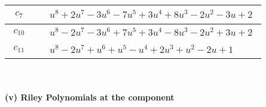 \documentclass[1p]{elsarticle_modified}
\theoremstyle{definition}
\begin{document}
\begin{tabular}{m{50pt}|m{274pt}}
\hline $$\begin{aligned}c_{7}\end{aligned}$$&$\begin{aligned}
&u^8+2 u^7-3 u^6-7 u^5+3 u^4+8 u^3-2 u^2-3 u+2
\end{aligned}$\\
\hline $$\begin{aligned}c_{10}\end{aligned}$$&$\begin{aligned}
&u^8-2 u^7-3 u^6+7 u^5+3 u^4-8 u^3-2 u^2+3 u+2
\end{aligned}$\\
\hline $$\begin{aligned}c_{11}\end{aligned}$$&$\begin{aligned}
&u^8-2 u^7+u^6+u^5- u^4+2 u^3+u^2-2 u+1
\end{aligned}$\\
\hline
\end{tabular}\\~\\
\newpage\renewcommand{\arraystretch}{1}
\flushleft \textbf{(v) Riley Polynomials at the component}\newline \\
\end{document}
